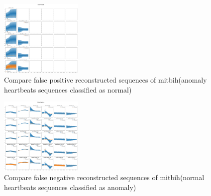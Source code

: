 \documentclass[nonacm,sigconf]{acmart}
\begin{document}
        \begin{figure}
        \centering
        \includegraphics[width=0.35\textwidth]{MIT-BIH/FP.png}
        \caption{Compare false positive reconstructed sequences of mitbih(anomaly heartbeats sequences classified as normal)}
        \label{fig:image1}
    \end{figure}%
        \begin{figure}
        \centering
        \includegraphics[width=0.35\textwidth]{MIT-BIH/FN.png}
        \caption{Compare false negative reconstructed sequences of mitbih(normal heartbeats sequences classified as anomaly)}
        \label{fig:image1}
    \end{figure}%

\end{document}
